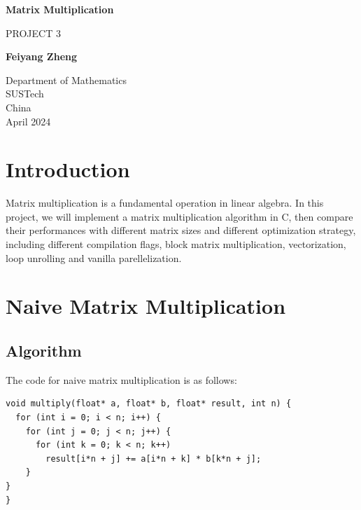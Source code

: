 \documentclass{article}
\begin{document}
\begin{titlepage}
  \begin{center}
    \vspace*{1cm}
    
    \Huge
    \textbf{Matrix Multiplication}
    
    \vspace{0.5cm}
    \LARGE
    PROJECT 3
    
    \vspace{1.5cm}
    
    \textbf{Feiyang Zheng}
    
    \vfill
    
    \vspace{0.8cm}
    
    \Large
    Department of Mathematics\\
    SUSTech\\
    China\\{April 2024}
    
  \end{center}
\end{titlepage}

\section{Introduction}

Matrix multiplication is a fundamental operation in linear algebra. In this project, we will implement a matrix multiplication algorithm in C, then compare their performances with different matrix sizes and different optimization strategy, including different compilation flags, block matrix multiplication, vectorization, loop unrolling and vanilla parellelization. 
\section{Naive Matrix Multiplication}
\subsection{Algorithm}

The code for naive matrix multiplication is as follows:
\begin{verbatim}
void multiply(float* a, float* b, float* result, int n) {
  for (int i = 0; i < n; i++) {
    for (int j = 0; j < n; j++) {
      for (int k = 0; k < n; k++)
        result[i*n + j] += a[i*n + k] * b[k*n + j];
    }
}
}
\end{verbatim}
\end{document}
